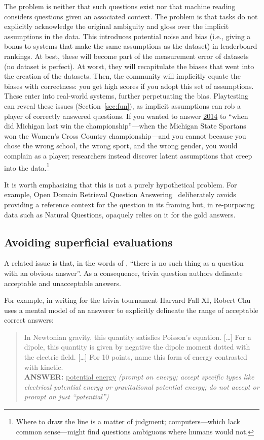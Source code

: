 The problem is neither that such questions exist nor that machine
reading  considers questions given an associated context.
The problem is that tasks do not explicitly acknowledge the original
ambiguity and gloss over the implicit assumptions in the data.
This introduces potential noise and bias (i.e., giving a bonus to systems that make
the same assumptions as the dataset) in leaderboard rankings. 
At best, these will become part of
the measurement error of datasets (no dataset is perfect). 
At worst, they will recapitulate the biases that went into the creation of the datasets.
Then, the community will implicitly equate the biases with correctness: you get high scores if you 
adopt this set of assumptions.
These enter into real-world systems, further perpetuating the bias.
Playtesting can reveal these issues (Section~\ref{sec:fun}), as implicit assumptions 
can rob a player of correctly answered questions.
If you wanted to answer \underline{2014} to ``when did Michigan last win the championship''---when the Michigan State Spartans won the Women's Cross Country championship---and you cannot because you chose the wrong school, the wrong sport, and the wrong gender,
you would complain as a player; researchers instead discover latent assumptions that creep into the data.\footnote{Where to draw the line is a matter of judgment; computers---which lack common sense---might find questions ambiguous where humans would not.}

It is worth emphasizing that this is not a purely hypothetical problem. For example, Open Domain Retrieval Question Answering~\citep{lee-19} deliberately avoids providing a reference context for the question in its framing but, in re-purposing data such as Natural Questions, opaquely relies on it for the gold answers.

\subsection{Avoiding superficial evaluations}

A related issue is that, in the words of \citet{voorhees-00}, ``there is no such
thing as a question with an obvious answer''.
As a consequence, trivia question authors 
delineate acceptable and unacceptable answers.

For example, in writing for the trivia tournament Harvard Fall XI, Robert Chu uses a mental model of an answerer to explicitly delineate the range of acceptable correct answers:
\begin{quote}
     In Newtonian gravity, this quantity satisfies Poisson's equation. [\dots] For a dipole, this quantity is given by negative the dipole moment dotted with the electric field. [\dots] For 10 points, name this form of energy contrasted with kinetic.\\
    {\bf ANSWER:} \underline{potential energy} \textit{(prompt on energy; accept specific types like electrical potential energy or gravitational potential energy; do not accept or prompt on just ``potential'')}
\end{quote}

